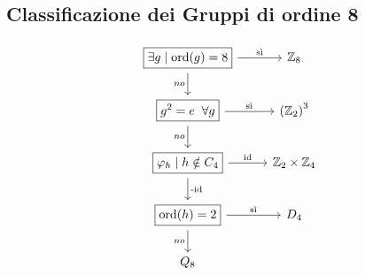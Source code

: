 \subsection{Classificazione dei Gruppi di ordine 8}
\[ \begin{tikzcd}
\boxed{\exists g \mid \text{ord}(g) = 8} \arrow{r}{\text{sì}} \arrow[swap]{d}{no} & \mathbb{Z}_8 \\
\boxed{g^2 = e \;\;\forall g \arrow{r}{\text{sì}}} \arrow[swap]{d}{no} & \left(\mathbb{Z}_2\right)^3 \\
\boxed{\varphi_h \mid h \notin C_4 \arrow{d}{\text{-id}}} \arrow{r}{\text{id}} & \mathbb{Z}_2 \times \mathbb{Z}_4  \\
\boxed{\text{ord}(h) = 2} \arrow{r}{\text{sì}} \arrow{d}[swap]{no}  & D_4 \\
Q_8
\end{tikzcd}
\]

